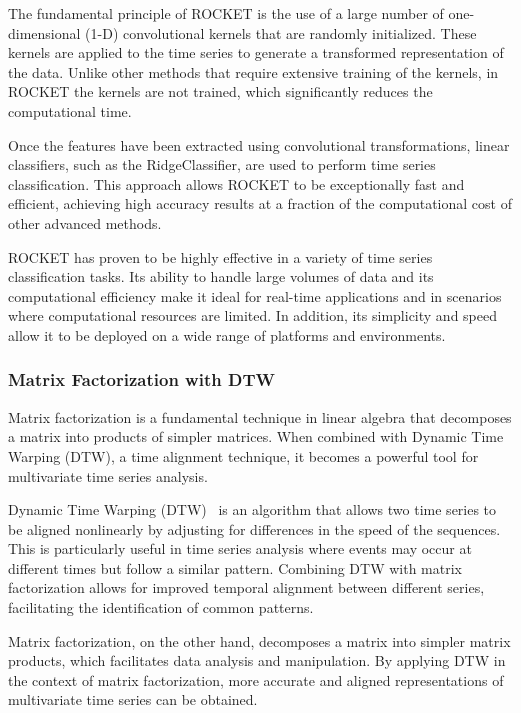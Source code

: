 The fundamental principle of ROCKET is the use of a large number of one-dimensional (1-D) convolutional kernels that are randomly initialized. These kernels are applied to the time series to generate a transformed representation of the data. Unlike other methods that require extensive training of the kernels, in ROCKET the kernels are not trained, which significantly reduces the computational time.

Once the features have been extracted using convolutional transformations, linear classifiers, such as the RidgeClassifier, are used to perform time series classification. This approach allows ROCKET to be exceptionally fast and efficient, achieving high accuracy results at a fraction of the computational cost of other advanced methods.

ROCKET has proven to be highly effective in a variety of time series classification tasks. Its ability to handle large volumes of data and its computational efficiency make it ideal for real-time applications and in scenarios where computational resources are limited. In addition, its simplicity and speed allow it to be deployed on a wide range of platforms and environments.
\vspace{10pt}

\subsubsection{Matrix Factorization with DTW}
Matrix factorization is a fundamental technique in linear algebra that decomposes a matrix into products of simpler matrices. When combined with Dynamic Time Warping (DTW), a time alignment technique, it becomes a powerful tool for multivariate time series analysis.

Dynamic Time Warping (DTW)~\cite{bringmann2023dynamicdynamictimewarping} is an algorithm that allows two time series to be aligned nonlinearly by adjusting for differences in the speed of the sequences. This is particularly useful in time series analysis where events may occur at different times but follow a similar pattern. Combining DTW with matrix factorization allows for improved temporal alignment between different series, facilitating the identification of common patterns.

Matrix factorization, on the other hand, decomposes a matrix into simpler matrix products, which facilitates data analysis and manipulation. By applying DTW in the context of matrix factorization, more accurate and aligned representations of multivariate time series can be obtained.

